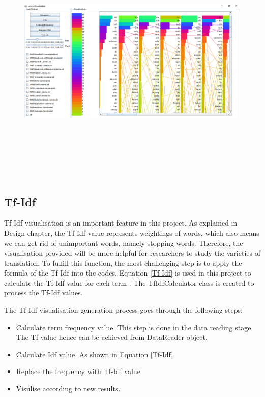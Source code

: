 \begin{figure}[h]
	\centering	
	\includegraphics[width=16cm, height=12cm]{Figs/LemmaView}\\[1ex]
	\caption{}
	\label{fig:lemmaView}
\end{figure} 

\subsection{Tf-Idf}

Tf-Idf visualisation is an important feature in this project. As explained in Design chapter, the Tf-Idf value represents weightings of words, which also means we can get rid of unimportant words, namely stopping words. Therefore, the visualisation provided will be more helpful for researchers to study the varieties of translation. To fulfill this function, the most challenging step is to apply the formula of the Tf-Idf into the codes. Equation \ref{Tf-Idf} is used in this project to calculate the Tf-Idf value for each term \cite{Asking Mohammad about the equation referance}. The TfIdfCalculator class is created to process the Tf-Idf values.

The Tf-Idf visualisation generation process goes through the following steps:

\begin{itemize}
\item \textbf{} Calculate term frequency value. This step is done in the data reading stage. The Tf value hence can be achieved from DataReader object.
\item \textbf{} Calculate Idf value. As shown in Equation \ref{Tf-Idf},
\item \textbf{} Replace the frequency with Tf-Idf value.
\item \textbf{} Visulise according to new results.
\end{itemize} 


